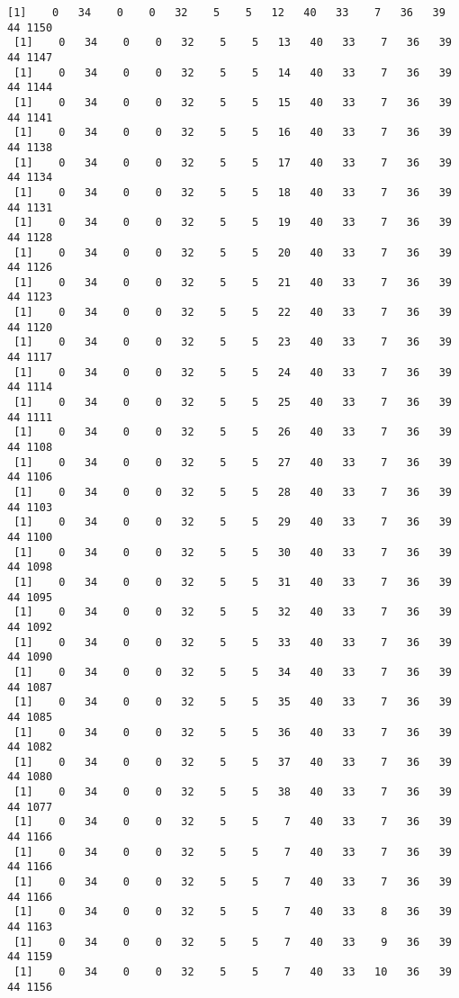 \documentclass[11pt]{article}
\begin{document}
\begin{Verbatim}[commandchars=\\\{\}]
 [1]    0   34    0    0   32    5    5   12   40   33    7   36   39   44 1150
 [1]    0   34    0    0   32    5    5   13   40   33    7   36   39   44 1147
 [1]    0   34    0    0   32    5    5   14   40   33    7   36   39   44 1144
 [1]    0   34    0    0   32    5    5   15   40   33    7   36   39   44 1141
 [1]    0   34    0    0   32    5    5   16   40   33    7   36   39   44 1138
 [1]    0   34    0    0   32    5    5   17   40   33    7   36   39   44 1134
 [1]    0   34    0    0   32    5    5   18   40   33    7   36   39   44 1131
 [1]    0   34    0    0   32    5    5   19   40   33    7   36   39   44 1128
 [1]    0   34    0    0   32    5    5   20   40   33    7   36   39   44 1126
 [1]    0   34    0    0   32    5    5   21   40   33    7   36   39   44 1123
 [1]    0   34    0    0   32    5    5   22   40   33    7   36   39   44 1120
 [1]    0   34    0    0   32    5    5   23   40   33    7   36   39   44 1117
 [1]    0   34    0    0   32    5    5   24   40   33    7   36   39   44 1114
 [1]    0   34    0    0   32    5    5   25   40   33    7   36   39   44 1111
 [1]    0   34    0    0   32    5    5   26   40   33    7   36   39   44 1108
 [1]    0   34    0    0   32    5    5   27   40   33    7   36   39   44 1106
 [1]    0   34    0    0   32    5    5   28   40   33    7   36   39   44 1103
 [1]    0   34    0    0   32    5    5   29   40   33    7   36   39   44 1100
 [1]    0   34    0    0   32    5    5   30   40   33    7   36   39   44 1098
 [1]    0   34    0    0   32    5    5   31   40   33    7   36   39   44 1095
 [1]    0   34    0    0   32    5    5   32   40   33    7   36   39   44 1092
 [1]    0   34    0    0   32    5    5   33   40   33    7   36   39   44 1090
 [1]    0   34    0    0   32    5    5   34   40   33    7   36   39   44 1087
 [1]    0   34    0    0   32    5    5   35   40   33    7   36   39   44 1085
 [1]    0   34    0    0   32    5    5   36   40   33    7   36   39   44 1082
 [1]    0   34    0    0   32    5    5   37   40   33    7   36   39   44 1080
 [1]    0   34    0    0   32    5    5   38   40   33    7   36   39   44 1077
 [1]    0   34    0    0   32    5    5    7   40   33    7   36   39   44 1166
 [1]    0   34    0    0   32    5    5    7   40   33    7   36   39   44 1166
 [1]    0   34    0    0   32    5    5    7   40   33    7   36   39   44 1166
 [1]    0   34    0    0   32    5    5    7   40   33    8   36   39   44 1163
 [1]    0   34    0    0   32    5    5    7   40   33    9   36   39   44 1159
 [1]    0   34    0    0   32    5    5    7   40   33   10   36   39   44 1156

\end{Verbatim}
\end{document}
